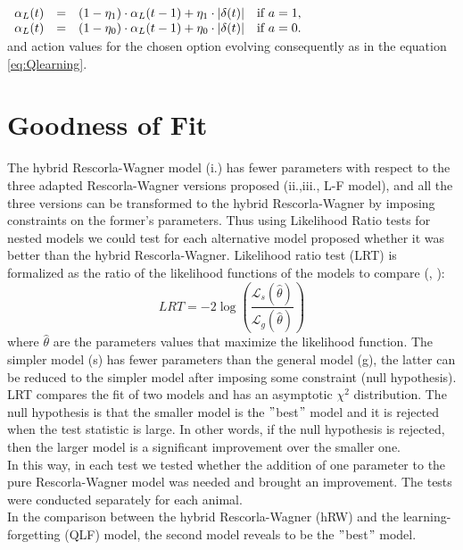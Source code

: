 \begin{description}
   $\begin{array}{lcll}
    \alpha_{L}(t) & = & (1-\eta_1)\cdot\alpha_{L}(t-1)+\eta_1\cdot\left\lvert\delta(t)\right\rvert & \mbox{if\,\,}  a=1,\\
    \alpha_{L}(t) & = & (1-\eta_0)\cdot\alpha_{L}(t-1)+\eta_0\cdot\left\lvert\delta(t)\right\rvert & \mbox{if\,\,}  a=0.\\
    \end{array}$\\
    and action values for the chosen option evolving consequently as in the equation \ref{eq:Qlearning}.
\end{description}
\section{Goodness of Fit}
\label{sec:Behavior}
The hybrid Rescorla-Wagner model (i.) has fewer parameters with respect to the three adapted Rescorla-Wagner versions proposed (ii.,iii., L-F model), and all the three versions can be transformed to the hybrid Rescorla-Wagner by imposing constraints on the former's parameters. Thus using Likelihood Ratio tests for nested models we could test for each alternative model proposed whether it was better than the hybrid Rescorla-Wagner. Likelihood ratio test (LRT) is formalized as the ratio of the likelihood functions of the models to compare (\cite{NeymanPearson}, \cite{King}): 
\begin{equation}
LRT = -2 \log (\frac{\mathcal{L}_s(\hat{\theta})}{\mathcal{L}_g(\hat{\theta})})
\label{eq:LRT}
\end{equation}
where $\hat{\theta}$ are the parameters values that maximize the likelihood function.
The simpler model (s) has fewer parameters than the general model (g), the latter can be reduced to the simpler model after imposing some constraint (null hypothesis).\\
LRT compares the fit of two models and has an asymptotic $\chi^2$ distribution. The null hypothesis is that the smaller model is the $"$best$"$ model and it is rejected when the test statistic is large. In other words, if the null hypothesis is rejected, then the larger model is a significant improvement over the smaller one.\\
In this way, in each test we tested whether the addition of one parameter to the pure Rescorla-Wagner model was needed and brought an improvement. The tests were conducted separately for each animal.\\In the comparison between the hybrid Rescorla-Wagner (hRW) and the learning-forgetting (QLF) model, the second model reveals to be the $"$best$"$ model.
